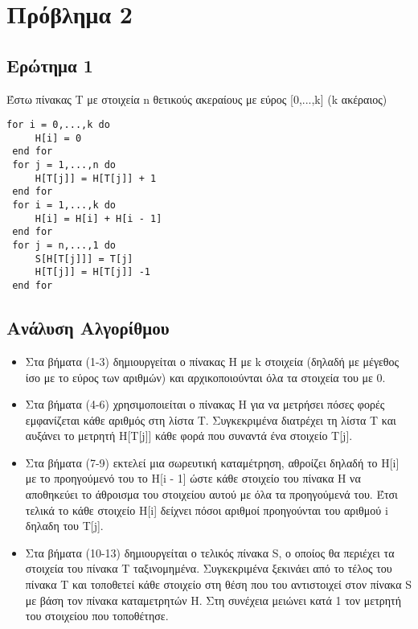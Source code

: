 \documentclass[a4paper]{article}
\begin{document}
\pagebreak
\section*{Πρόβλημα 2}
\subsection*{\color{red}Ερώτημα 1}


\begin{tcolorbox}[colback=blue!20!white,colframe=purple!60!white,title=\textbf{Algorithm 1}]
Έστω πίνακας T με στοιχεία n θετικούς ακεραίους με εύρος [0,...,k] (k ακέραιος)
\begin{lstlisting}[mathescape]
 for i = 0,...,k do
	 H[i] = 0
 end for
 for j = 1,...,n do
	 H[T[j]] = H[T[j]] + 1
 end for
 for i = 1,...,k do
	 H[i] = H[i] + H[i - 1]
 end for
 for j = n,...,1 do
	 S[H[T[j]]] = T[j]
	 H[T[j]] = H[T[j]] -1
 end for
\end{lstlisting}
\end{tcolorbox}

\subsection*{Ανάλυση Αλγορίθμου}
\begin{itemize}
\item Στα βήματα (1-3) δημιουργείται ο πίνακας H με k στοιχεία (δηλαδή  με μέγεθος ίσο με το εύρος των αριθμών) και αρχικοποιούνται όλα τα στοιχεία του με 0.
\item Στα βήματα (4-6) χρησιμοποιείται ο πίνακας H για να μετρήσει πόσες φορές εμφανίζεται κάθε αριθμός στη λίστα T. Συγκεκριμένα διατρέχει τη λίστα T και αυξάνει το μετρητή H[T[j]] κάθε φορά που συναντά ένα στοιχείο T[j].
\item Στα βήματα (7-9) εκτελεί μια σωρευτική καταμέτρηση, αθροίζει δηλαδή το H[i] με το προηγούμενό του το H[i - 1] ώστε κάθε στοιχείο του πίνακα H να αποθηκεύει το άθροισμα του στοιχείου αυτού με όλα τα προηγούμενά του. Έτσι τελικά το κάθε στοιχείο H[i] δείχνει πόσοι αριθμοί προηγούνται του αριθμού i δηλαδη του T[j].
\item Στα βήματα (10-13) δημιουργείται ο τελικός πίνακα S, ο οποίος θα περιέχει τα στοιχεία του πίνακα T ταξινομημένα. Συγκεκριμένα ξεκινάει από το τέλος του πίνακα T και τοποθετεί κάθε στοιχείο στη θέση που του αντιστοιχεί στον πίνακα S με βάση τον πίνακα καταμετρητών H. Στη συνέχεια μειώνει κατά 1 τον μετρητή του στοιχείου που τοποθέτησε.
\end{itemize}
\end{document}
